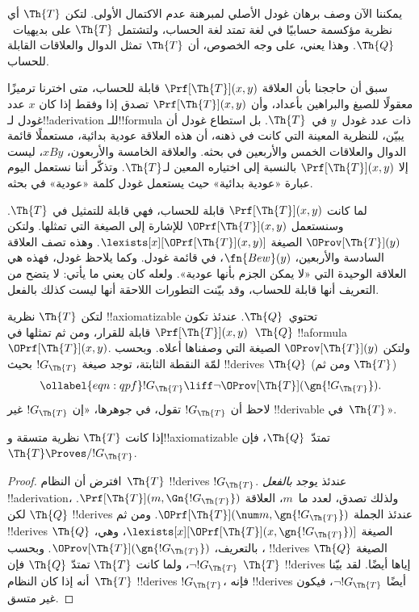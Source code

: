\documentclass[../../../include/open-logic-section]{subfiles}
\begin{document}


يمكننا الآن وصف برهان غودل الأصلي لمبرهنة عدم الاكتمال الأولى. لتكن
$\Th{T}$ أي نظرية مؤكسمة حسابيًا في لغة تمتد لغة الحساب، ولتشتمل
$\Th{T}$ على بديهيات~$\Th{Q}$. وهذا يعني، على وجه الخصوص، أن
$\Th{T}$ تمثل الدوال والعلاقات القابلة للحساب.

سبق أن حاججنا بأن العلاقة $\Prf[\Th{T}](x,y)$ قابلة للحساب، متى
اخترنا ترميزًا معقولًا للصيغ والبراهين بأعداد، وأن
$\Prf[\Th{T}](x,y)$ تصدق إذا وفقط إذا كان $x$ عدد غودل
لـ!!a{derivation} للـ!!{formula} ذات عدد غودل~$y$ في~$\Th{T}$. بل
استطاع غودل أن يبيّن، للنظرية المعينة التي كانت في ذهنه، أن هذه
العلاقة عودية بدائية، مستعملًا قائمة الدوال والعلاقات الخمس والأربعين
في بحثه. والعلاقة الخامسة والأربعون، $x B y$، ليست إلا
$\Prf[\Th{T}](x,y)$ بالنسبة إلى اختياره المعين لـ$\Th{T}$. وتذكّر
أننا نستعمل اليوم عبارة «عودية بدائية» حيث يستعمل غودل كلمة «عودية»
في بحثه.

لما كانت $\Prf[\Th{T}](x,y)$ قابلة للحساب، فهي قابلة للتمثيل في
$\Th{T}$. وسنستعمل $\OPrf[\Th{T}](x,y)$ للإشارة إلى الصيغة التي
تمثلها. ولتكن $\OProv[\Th{T}](y)$ الصيغة
$\lexists[x][\OPrf[\Th{T}](x,y)]$. وهذه تصف العلاقة السادسة
والأربعين، $\fn{Bew}(y)$، في قائمة غودل. وكما يلاحظ غودل، فهذه هي
العلاقة الوحيدة التي «لا يمكن الجزم بأنها عودية». ولعله كان يعني ما
يأتي: لا يتضح من التعريف أنها قابلة للحساب، وقد بيّنت التطورات اللاحقة
أنها ليست كذلك بالفعل.

لتكن $\Th{T}$ نظرية !!{axiomatizable} تحتوي~$\Th{Q}$. عندئذ تكون
$\Prf[\Th{T}](x,y)$ قابلة للقرار، ومن ثم تمثلها في~$\Th{Q}$
!!a{formula}~$\OPrf[\Th{T}](x,y)$. ولتكن $\OProv[\Th{T}](y)$ الصيغة
التي وصفناها أعلاه. وبحسب لمّة النقطة الثابتة، توجد صيغة
$!G_\Th{T}$ بحيث !!{derive}s $\Th{Q}$ (ومن ثم $\Th{T}$)
\begin{equation}
\ollabel{eqn:qpf}
!G_\Th{T} \liff \lnot \OProv[\Th{T}](\gn{!G_\Th{T}}).
\end{equation}
لاحظ أن $!G_\Th{T}$ تقول، في جوهرها، «إن $!G_\Th{T}$ غير
!!{derivable} في~$\Th{T}$».

\begin{lem}
إذا كانت $\Th{T}$ نظرية متسقة و!!{axiomatizable} تمتدّ~$\Th{Q}$،
فإن $\Th{T}\Proves/ !G_\Th{T}$.
\end{lem}

\begin{proof}
افترض أن النظام~$\Th{T}$ !!{derive}s $!G_\Th{T}$. عندئذ يوجد
\emph{بالفعل} !!a{derivation}، ولذلك تصدق، لعدد ما~$m$، العلاقة
$\Prf[\Th{T}](m,\Gn{!G_\Th{T}})$. لكن $\Th{Q}$ !!{derive}s عندئذ
الجملة $\OPrf[\Th{T}](\num m,\gn{!G_\Th{T}})$. ومن ثم !!{derive}s
$\Th{Q}$ الصيغة
$\lexists[x][\OPrf[\Th{T}](x,\gn{!G_\Th{T}})]$، وهي، بالتعريف،
$\OProv[\Th{T}](\gn{!G_\Th{T}})$. وبحسب ،
!!{derive}s $\Th{Q}$ الصيغة $\lnot !G_\Th{T}$، ولما كانت $\Th{T}$
تمتدّ $\Th{Q}$ فإن $\Th{T}$ !!{derive}s إياها أيضًا. لقد بيّنا أنه
إذا كان النظام~$\Th{T}$ !!{derive}s $!G_\Th{T}$، فإنه !!{derive}s
أيضًا $\lnot !G_\Th{T}$، فيكون غير متسق.
\end{proof}
\end{document}
